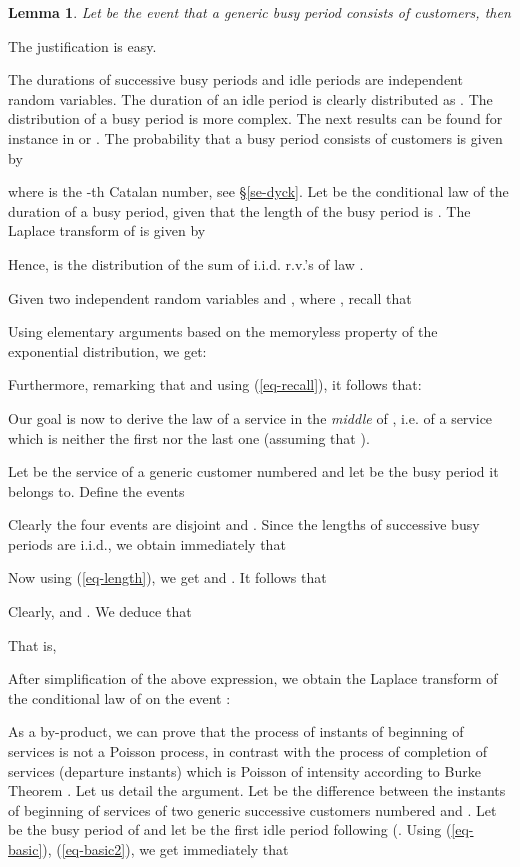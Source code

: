 \documentclass[11pt,a4paper]{article}
\numberwithin{equation}{section}
\newtheorem{lem}[prop]{Lemma}
\newcommand{\1}{\mathbbm{1}}
\def\eref#1{(\ref{#1})}
\begin{document}
\begin{lem}\label{le-easy}
Let  be  the event that a generic busy period consists
of  customers, then

\end{lem}
\noindent
The justification is easy.

The durations of successive busy periods and idle
periods are independent random variables.
The duration of an idle period is clearly distributed as
. The distribution of a busy period is more
complex. The next results can be found for instance in \cite[Chapter
II.2.2]{cohe82} or \cite[Chapter 1.2]{taka}.
The probability that a busy period 
consists of  customers is given by

where  is the -th Catalan number, see \S \ref{se-dyck}.
Let  be the conditional law of the duration of a busy period, given that the length
of the busy
period is .
The Laplace
transform of  is given by

Hence,  is the distribution of the sum of  i.i.d. r.v.'s of law
.

\medskip

Given two independent random variables 
and , where ,
recall that

Using elementary arguments based on the memoryless property of the
exponential distribution, we get:

Furthermore, remarking that  and
using \eref{eq-recall}, it follows that:

Our goal is now to derive the law of a service in the {\em middle} of
, i.e. of a service which is neither the first nor the last one
(assuming that ).

Let  be the service of a generic customer numbered 
and let  be the busy period it belongs to. Define the events

Clearly the four events are disjoint and . Since the lengths of successive busy periods
are i.i.d., we obtain immediately that

Now using (\ref{eq-length}), we get 
and . It follows that

Clearly,  and . We deduce that

That is,

After simplification of the above expression, we obtain the
Laplace transform of the conditional law of  on the event
 :


As a by-product, we can prove that the process of
instants of beginning of services is not a Poisson process,
in contrast
with the process of completion of services (departure instants) which
is Poisson of intensity  according to Burke Theorem
\cite{burk,reic}.
Let us detail the argument. Let  be the difference between the
instants of beginning of services of two generic successive customers
numbered  and . Let  be the busy period of  and let  be the first idle period following
 (. Using \eref{eq-basic},
\eref{eq-basic2}, we get immediately that
\end{document}

